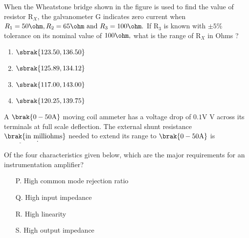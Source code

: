 \bigskip
\item When the Wheatstone bridge shown in the figure is used to find the value of resistor R$_{X}$, the galvanometer G indicates zero current when $R_{1}=50\ohm, R_{2}=65\ohm \text{ and } R_{3}=100\ohm. $ If R$_{3}$ is known with $\pm 5\%$ tolerance on its nominal value of $100\ohm,$ what is the range of R$_{X}$ in Ohms ?
\begin{figure}[H]
\centering
{}%

\end{figure}
\begin{enumerate}
        \item $\sbrak{123.50,136.50}$
        \item $\sbrak{125.89,134.12}$
        \item $\sbrak{117.00,143.00}$
        \item $\sbrak{120.25,139.75}$
\end{enumerate}
\bigskip
\item A $\brak{0-50\text{A}}$ moving coil ammeter has a voltage drop of $0.1$V V across its terminals at full scale deflection. The external shunt resistance $\brak{\text{in milliohms}}$ needed to extend its range to $\brak{0-50\text{A}}$ is $\underline{\hspace{2cm}}.$
\bigskip
\item Of the four characteristics given below, which are the major requirements for an instrumentation amplifier? 
\begin{enumerate}[label=\Alph*]
    \item[P.] High common mode rejection ratio
    \item[Q.] High input impedance
    \item[R.] High linearity
    \item[S.] High output impedance
\end{enumerate}
